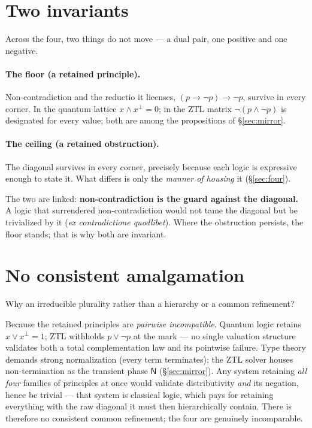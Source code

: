 \documentclass[11pt]{article}
\theoremstyle{remark}
\newcommand{\Nph}{\mathsf{N}}
\begin{document}
\section{Two invariants}\label{sec:inv}

Across the four, two things do not move --- a dual pair, one positive and one
negative.

\paragraph{The floor (a retained principle).} Non-contradiction and the
reductio it licenses, $(p \to \neg p) \to \neg p$, survive in every corner. In
the quantum lattice $x \wedge x^{\perp} = 0$; in the ZTL matrix
$\neg(p \wedge \neg p)$ is designated for every value; both are among the
propositions of \S\ref{sec:mirror}.

\paragraph{The ceiling (a retained obstruction).} The diagonal survives in
every corner, precisely because each logic is expressive enough to state it.
What differs is only the \emph{manner of housing} it (\S\ref{sec:four}).

The two are linked: \textbf{non-contradiction is the guard against the
diagonal.} A logic that surrendered non-contradiction would not tame the
diagonal but be trivialized by it (\emph{ex contradictione quodlibet}). Where
the obstruction persists, the floor stands; that is why both are invariant.

\section{No consistent amalgamation}\label{sec:noamalg}

Why an irreducible plurality rather than a hierarchy or a common refinement?

Because the retained principles are \emph{pairwise incompatible}. Quantum
logic retains $x \vee x^{\perp} = 1$; ZTL withholds $p \vee \neg p$ at the
mark --- no single valuation structure validates both a total complementation
law and its pointwise failure. Type theory demands strong normalization
(every term terminates); the ZTL solver houses non-termination as the
transient phase $\Nph$ (\S\ref{sec:mirror}). Any system retaining \emph{all
four} families of principles at once would validate distributivity \emph{and}
its negation, hence be trivial --- that system is classical logic, which pays
for retaining everything with the raw diagonal it must then hierarchically
contain. There is therefore no consistent common refinement; the four are
genuinely incomparable.
\end{document}
